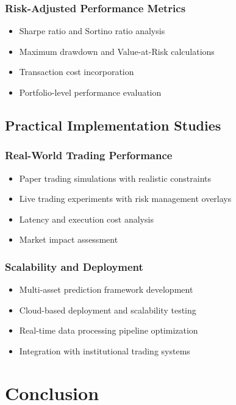 \documentclass[11pt,a4paper]{article}
\begin{document}
\subsubsection{Risk-Adjusted Performance Metrics}
\begin{itemize}
    \item Sharpe ratio and Sortino ratio analysis
    \item Maximum drawdown and Value-at-Risk calculations
    \item Transaction cost incorporation
    \item Portfolio-level performance evaluation
\end{itemize}

\subsection{Practical Implementation Studies}

\subsubsection{Real-World Trading Performance}
\begin{itemize}
    \item Paper trading simulations with realistic constraints
    \item Live trading experiments with risk management overlays
    \item Latency and execution cost analysis
    \item Market impact assessment
\end{itemize}

\subsubsection{Scalability and Deployment}
\begin{itemize}
    \item Multi-asset prediction framework development
    \item Cloud-based deployment and scalability testing
    \item Real-time data processing pipeline optimization
    \item Integration with institutional trading systems
\end{itemize}

\section{Conclusion}
\end{document}
